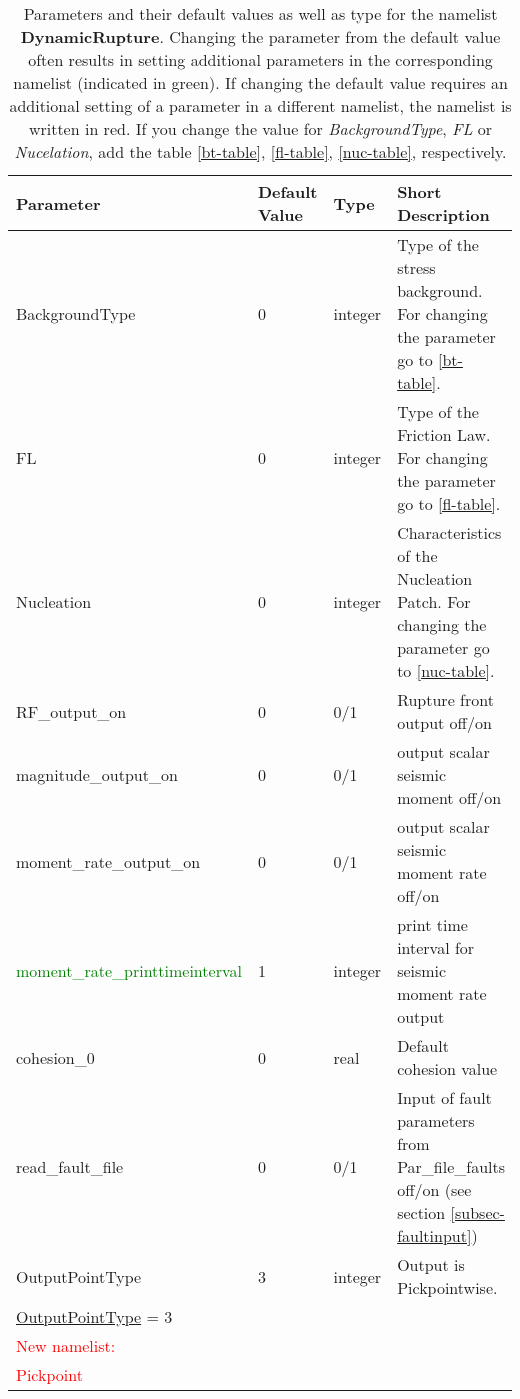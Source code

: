 \documentclass[12pt,twoside]{article}
\begin{document}
\begin{longtable}{|p{4.8cm}|p{2.4cm}|p{2cm}|p{5cm}|}
\caption{Parameters and their default values as well as type for the namelist \textbf{DynamicRupture}.
         Changing the parameter from the default value often results in setting additional parameters
         in the corresponding namelist (indicated in green).
         If changing the default value requires an additional setting of a parameter in a different namelist,
         the namelist is written in red. If you change the value for
         \textit{BackgroundType}, \textit{FL} or \textit{Nucelation}, add the table \ref{bt-table},
         \ref{fl-table}, \ref{nuc-table}, respectively.} \\
\hline
Parameter & Default Value & Type & Short Description \\
\hline
\hline
BackgroundType & 0 & integer & Type of the stress background. For changing the parameter go to \ref{bt-table}.\\
\hline
FL & 0 & integer & Type of the Friction Law. For changing the parameter go to \ref{fl-table}.\\
\hline
Nucleation & 0 & integer &  Characteristics of the Nucleation Patch. For changing the parameter go to \ref{nuc-table}.\\
\hline
RF\_output\_on & 0 & 0/1 & Rupture front output off/on\\
\hline
magnitude\_output\_on & 0 & 0/1 & output scalar seismic moment off/on\\
\hline
moment\_rate\_output\_on & 0 & 0/1 & output scalar seismic moment rate off/on\\
\hline
\textcolor{green}{moment\_rate\_printtimeinterval} & 1 & integer & print time interval for seismic moment rate output\\
\hline
cohesion\_0 & 0 & real & Default cohesion value\\
\hline
read\_fault\_file & 0 & 0/1 & Input of fault parameters from Par\_file\_faults off/on (see section \ref{subsec-faultinput})\\
\hline
OutputPointType & 3 & integer & Output is Pickpointwise.\\
\hdashline
\uline{OutputPointType} = 3 & & &\\
\textcolor{red}{New namelist:} & & &\\
\textcolor{red}{Pickpoint} & & &\\

\end{longtable}
\end{document}
